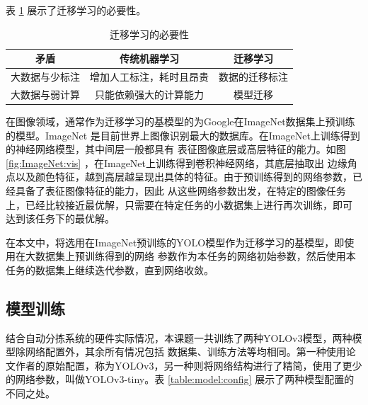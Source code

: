 表 \ref{table:TL:biyao} 展示了迁移学习的必要性。
{
    \begin{table}[htb] 
        \caption{迁移学习的必要性}
        \label{table:TL:biyao}
        \centering
        \begin{tabular}[t]{c|c|c}
            \hline
            矛盾 & 传统机器学习 & 迁移学习 \\
            \hline
            大数据与少标注 & 增加人工标注，耗时且昂贵 & 数据的迁移标注\\
            \hline
            大数据与弱计算 & 只能依赖强大的计算能力 & 模型迁移\\
            \hline
        \end{tabular}
    \end{table}
}

在图像领域，通常作为迁移学习的基模型的为Google在ImageNet数据集上预训练的模型。ImageNet
是目前世界上图像识别最大的数据库。在ImageNet上训练得到的神经网络模型，其中间层一般都具有
表征图像底层或高层特征的能力。如图 \cite{ImageNet_vis} \ref{fig:ImageNet:vis} ，在ImageNet上训练得到卷积神经网络，其底层抽取出
边缘角点以及颜色特征，越到高层越呈现出具体的特征。由于预训练得到的网络参数，已经具备了表征图像特征的能力，因此
从这些网络参数出发，在特定的图像任务上，已经比较接近最优解，只需要在特定任务的小数据集上进行再次训练，即可
达到该任务下的最优解。



在本文中，将选用在ImageNet预训练的YOLO模型作为迁移学习的基模型，即使用在大数据集上预训练得到的网络
参数作为本任务的网络初始参数，然后使用本任务的数据集上继续迭代参数，直到网络收敛。






\subsection{模型训练}
结合自动分拣系统的硬件实际情况，本课题一共训练了两种YOLOv3模型，两种模型除网络配置外，其余所有情况包括
数据集、训练方法等均相同。第一种使用论文作者的原始配置，称为YOLOv3，另一种则将网络结构进行了精简，使用了更少
的网络参数，叫做YOLOv3-tiny。表 \ref{table:model:config} 展示了两种模型配置的不同之处。

